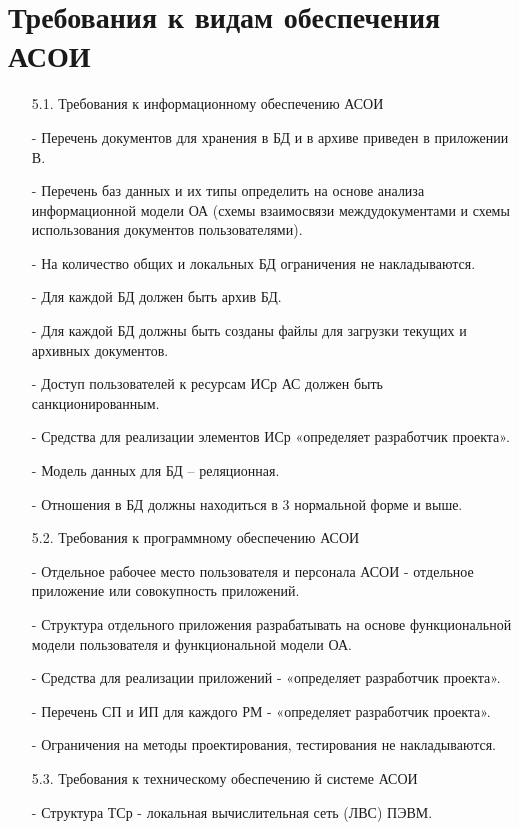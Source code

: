 \documentclass[12pt, a4paper, simple]{eskdtext}
\begin{document}
    \section{Требования к видам обеспечения АСОИ}
           
    \begin{enumerate}
        \item[5.1.] Требования к информационному обеспечению АСОИ
        \item[-] Перечень документов для хранения в БД и в архиве приведен в приложении В.
        \item[-] Перечень баз данных и их типы определить на основе анализа информационной модели ОА
        (схемы взаимосвязи междудокументами и схемы использования документов пользователями). 
        \item[-] На количество общих и локальных БД ограничения не накладываются.
        \item[-] Для каждой БД должен быть архив БД.
        \item[-] Для каждой БД должны быть созданы файлы для загрузки текущих и архивных документов.
        \item[-] Доступ пользователей к ресурсам ИСр АС должен быть санкционированным.
        \item[-] Средства для реализации элементов ИСр «опреде­ляет разра­ботчик про­екта».
        \item[-] Модель данных для БД – реляционная.
        \item[-] Отношения в БД должны находиться в 3 нормальной форме и выше.
        \item[5.2.] Требования к программному обеспечению АСОИ
        \item[-] Отдельное рабочее место пользователя и персонала АСОИ - отдельное приложение или совокупность приложений.
        \item[-] Структура отдельного приложения разрабатывать на основе функциональной модели пользователя
        и функциональной модели ОА.
        \item[-] Средства для реализации приложений - «определяет разра­ботчик про­екта».
        \item[-] Перечень  СП и ИП для каждого РМ - «определяет разра­ботчик про­екта».
        \item[-] Ограничения на методы проектирования, тестирования не накладываются. 
        \item[5.3.] Требования к техническому обеспечению й системе АСОИ
        \item[-] Структура ТСр - локальная вычислительная сеть (ЛВС) ПЭВМ.

\end{enumerate}
\end{document}
